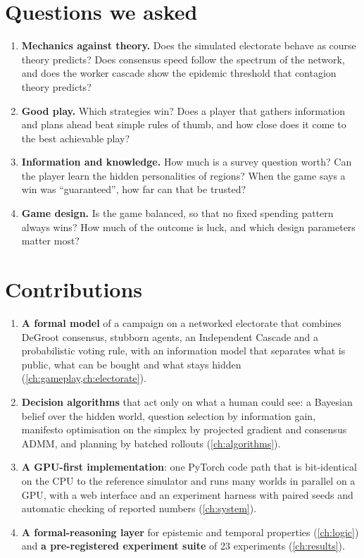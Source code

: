 \documentclass[11pt,a4paper,oneside]{report}
\begin{document}
\section{Questions we asked}

\begin{enumerate}[label=\textbf{Q\arabic*.}]
  \item \textbf{Mechanics against theory.} Does the simulated electorate behave as course theory predicts?
        Does consensus speed follow the spectrum of the network, and does the worker cascade show the
        epidemic threshold that contagion theory predicts?
  \item \textbf{Good play.} Which strategies win? Does a player that gathers information and plans ahead
        beat simple rules of thumb, and how close does it come to the best achievable play?
  \item \textbf{Information and knowledge.} How much is a survey question worth? Can the player learn the
        hidden personalities of regions? When the game says a win was ``guaranteed'', how far can that be
        trusted?
  \item \textbf{Game design.} Is the game balanced, so that no fixed spending pattern always wins? How much
        of the outcome is luck, and which design parameters matter most?
\end{enumerate}

\section{Contributions}

\begin{enumerate}
  \item \textbf{A formal model} of a campaign on a networked electorate that combines DeGroot consensus,
        stubborn agents, an Independent Cascade and a probabilistic voting rule, with an information model
        that separates what is public, what can be bought and what stays hidden
        (\cref{ch:gameplay,ch:electorate}).
  \item \textbf{Decision algorithms} that act only on what a human could see: a Bayesian belief over the
        hidden world, question selection by information gain, manifesto optimisation on the simplex by
        projected gradient and consensus ADMM, and planning by batched rollouts (\cref{ch:algorithms}).
  \item \textbf{A GPU-first implementation}: one PyTorch code path that is bit-identical on the CPU to the
        reference simulator and runs many worlds in parallel on a GPU, with a web interface and an
        experiment harness with paired seeds and automatic checking of reported numbers
        (\cref{ch:system}).
  \item \textbf{A formal-reasoning layer} for epistemic and temporal properties (\cref{ch:logic}) and
        \textbf{a pre-registered experiment suite} of 23 experiments (\cref{ch:results}).
\end{enumerate}
\end{document}
